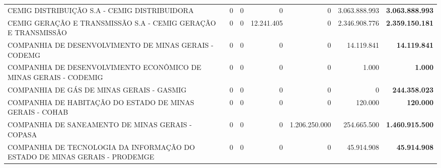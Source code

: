 \documentclass{article}
\begin{document}
\begin{longtable}[c]{m{5cm}|m{2cm}|m{2cm}|m{2cm}|m{2cm}|m{2cm}|m{2cm}}
\multicolumn{1}{L{5cm}|}{CEMIG DISTRIBUIÇÃO S.A - CEMIG DISTRIBUIDORA} & \multicolumn{1}{r|}{    0} & \multicolumn{1}{r|}{0} & \multicolumn{1}{r|}{          0} & \multicolumn{1}{r|}{            0} & \multicolumn{1}{r|}{3.063.888.993} & \multicolumn{1}{r}{ \textbf{3.063.888.993}} \\
\multicolumn{1}{L{5cm}|}{CEMIG GERAÇÃO E TRANSMISSÃO S.A - CEMIG GERAÇÃO E TRANSMISSÃO} & \multicolumn{1}{r|}{    0} & \multicolumn{1}{r|}{0} & \multicolumn{1}{r|}{12.241.405} & \multicolumn{1}{r|}{            0} & \multicolumn{1}{r|}{2.346.908.776} & \multicolumn{1}{r}{ \textbf{2.359.150.181}} \\
\multicolumn{1}{L{5cm}|}{COMPANHIA DE DESENVOLVIMENTO DE MINAS GERAIS - CODEMG} & \multicolumn{1}{r|}{    0} & \multicolumn{1}{r|}{0} & \multicolumn{1}{r|}{          0} & \multicolumn{1}{r|}{            0} & \multicolumn{1}{r|}{14.119.841} & \multicolumn{1}{r}{ \textbf{14.119.841}} \\
\multicolumn{1}{L{5cm}|}{COMPANHIA DE DESENVOLVIMENTO ECONÔMICO DE MINAS GERAIS - CODEMIG} & \multicolumn{1}{r|}{    0} & \multicolumn{1}{r|}{0} & \multicolumn{1}{r|}{          0} & \multicolumn{1}{r|}{            0} & \multicolumn{1}{r|}{1.000} & \multicolumn{1}{r}{ \textbf{1.000}} \\
\multicolumn{1}{L{5cm}|}{COMPANHIA DE GÁS DE MINAS GERAIS - GASMIG} & \multicolumn{1}{r|}{    0} & \multicolumn{1}{r|}{0} & \multicolumn{1}{r|}{          0} & \multicolumn{1}{r|}{            0} & \multicolumn{1}{r|}{            0} & \multicolumn{1}{r}{ \textbf{244.358.023}} \\
\multicolumn{1}{L{5cm}|}{COMPANHIA DE HABITAÇÃO DO ESTADO DE MINAS GERAIS - COHAB} & \multicolumn{1}{r|}{    0} & \multicolumn{1}{r|}{0} & \multicolumn{1}{r|}{          0} & \multicolumn{1}{r|}{            0} & \multicolumn{1}{r|}{120.000} & \multicolumn{1}{r}{ \textbf{120.000}} \\
\multicolumn{1}{L{5cm}|}{COMPANHIA DE SANEAMENTO DE MINAS GERAIS - COPASA} & \multicolumn{1}{r|}{    0} & \multicolumn{1}{r|}{0} & \multicolumn{1}{r|}{          0} & \multicolumn{1}{r|}{1.206.250.000} & \multicolumn{1}{r|}{254.665.500} & \multicolumn{1}{r}{ \textbf{1.460.915.500}} \\
\multicolumn{1}{L{5cm}|}{COMPANHIA DE TECNOLOGIA DA INFORMAÇÃO DO ESTADO DE MINAS GERAIS - PRODEMGE} & \multicolumn{1}{r|}{    0} & \multicolumn{1}{r|}{0} & \multicolumn{1}{r|}{          0} & \multicolumn{1}{r|}{            0} & \multicolumn{1}{r|}{45.914.908} & \multicolumn{1}{r}{ \textbf{45.914.908}} \\

\end{longtable}
\end{document}
